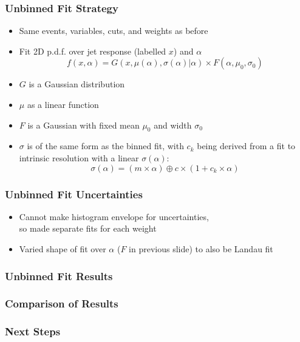 \documentclass{beamer}
\newcommand{\beginbackup}{
  \newcounter{framenumbervorappendix}
  \setcounter{framenumbervorappendix}{\value{framenumber}}
}
\newcommand{\backupend}{
  \addtocounter{framenumbervorappendix}{-\value{framenumber}}
  \addtocounter{framenumber}{\value{framenumbervorappendix}}
}
\begin{document}
\begin{frame}
  \frametitle{Unbinned Fit Strategy}

  \begin{itemize}
  \item Same events, variables, cuts, and weights as before
  \item Fit 2D p.d.f. over jet response (labelled $x$) and $\alpha$
  \[
  f(x, \alpha) =
  G(x, \mu(\alpha), \sigma(\alpha)|\alpha)
  \times
  F(\alpha, \mu_0, \sigma_0)
  \]
  \item $G$ is a Gaussian distribution
  \item $\mu$ as a linear function
  \item $F$ is a Gaussian with fixed mean $\mu_0$ and width $\sigma_0$
  \item $\sigma$ is of the same form as the binned fit,
    with $c_k$ being derived from a fit to
    intrinsic resolution with a linear $\sigma(\alpha)$:
  \[
  \sigma(\alpha) = (m \times \alpha) \oplus c \times (1 + c_k \times \alpha)
  \]
  \end{itemize}


\end{frame}


\begin{frame}
  \frametitle{Unbinned Fit Uncertainties}

  \begin{itemize}
  \item Cannot make histogram envelope for uncertainties, \\
    so made separate fits for each weight
  \item Varied shape of fit over $\alpha$ ($F$ in previous slide) to also be Landau fit
  \end{itemize}



\end{frame}


\begin{frame}
  \frametitle{Unbinned Fit Results}

\end{frame}


\begin{frame}
  \frametitle{Comparison of Results}

\end{frame}


\begin{frame}
  \frametitle{Next Steps}

\end{frame}


\begin{comment}
\beginbackup

\begin{frame}
  \centering
    {\Huge \bf\sffamily Backup Slides}
\end{frame}



\backupend
\end{comment}
\end{document}
